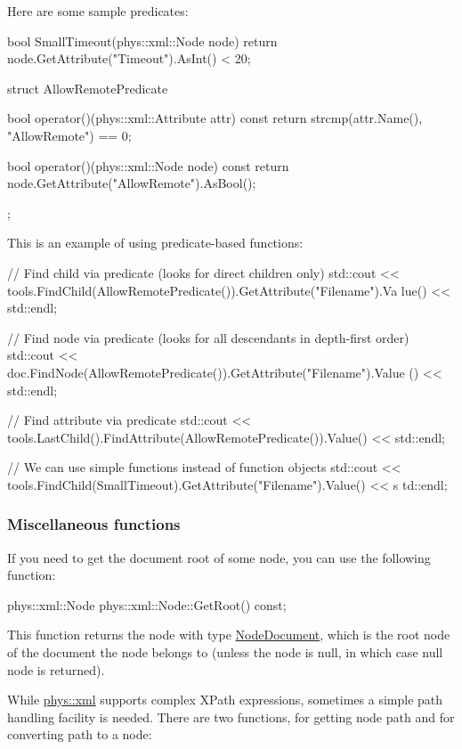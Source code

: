  \par
 Here are some sample predicates: 
\begin{DoxyCode}
 bool SmallTimeout(phys::xml::Node node)
 {
     return node.GetAttribute("Timeout").AsInt() < 20;
 }

 struct AllowRemotePredicate
 {
     bool operator()(phys::xml::Attribute attr) const
     {
         return strcmp(attr.Name(), "AllowRemote") == 0;
     }

     bool operator()(phys::xml::Node node) const
     {
         return node.GetAttribute("AllowRemote").AsBool();
     }
 };
\end{DoxyCode}
 This is an example of using predicate-\/based functions: 
\begin{DoxyCode}
 // Find child via predicate (looks for direct children only)
 std::cout << tools.FindChild(AllowRemotePredicate()).GetAttribute("Filename").Va
      lue() << std::endl;

 // Find node via predicate (looks for all descendants in depth-first order)
 std::cout << doc.FindNode(AllowRemotePredicate()).GetAttribute("Filename").Value
      () << std::endl;

 // Find attribute via predicate
 std::cout << tools.LastChild().FindAttribute(AllowRemotePredicate()).Value() << 
      std::endl;

 // We can use simple functions instead of function objects
 std::cout << tools.FindChild(SmallTimeout).GetAttribute("Filename").Value() << s
      td::endl;
\end{DoxyCode}
 \hypertarget{XMLManual_XMLAccessingMisc}{}\subsubsection{Miscellaneous functions}\label{XMLManual_XMLAccessingMisc}
If you need to get the document root of some node, you can use the following function: 
\begin{DoxyCode}
 phys::xml::Node phys::xml::Node::GetRoot() const;
\end{DoxyCode}
 This function returns the node with type \hyperlink{namespacephys_1_1xml_a668b0cc666a9d49f7c7222a7552115d3}{NodeDocument}, which is the root node of the document the node belongs to (unless the node is null, in which case null node is returned). \par
 \par
 While \hyperlink{namespacephys_1_1xml}{phys::xml} supports complex XPath expressions, sometimes a simple path handling facility is needed. There are two functions, for getting node path and for converting path to a node: 
